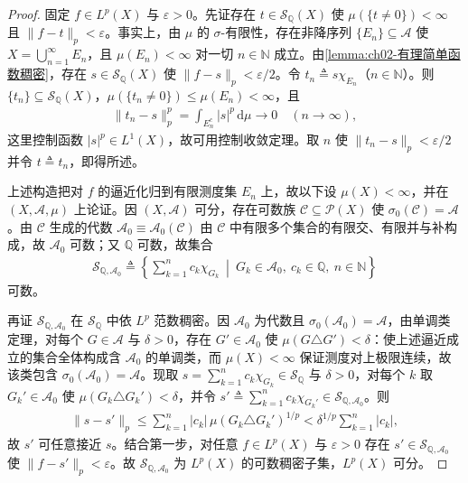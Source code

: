 \documentclass[../../main.tex]{subfiles}%
\begin{document}
\begin{proof}
固定 $f\in L^p(X)$ 与 $\varepsilon>0$。先证存在 $t\in\mathscr S_{\mathbb Q}(X)$ 使 $\mu(\{t\neq0\})<\infty$ 且 $\|f-t\|_p<\varepsilon$。事实上，由 $\mu$ 的 $\sigma$-有限性，存在非降序列 $\{E_n\}\subseteq\mathscr A$ 使 $X=\bigcup_{n=1}^\infty E_n$，且 $\mu(E_n)<\infty$ 对一切 $n\in\mathbb N$ 成立。由\cref{lemma:ch02-有理简单函数稠密}，存在 $s\in\mathscr S_{\mathbb Q}(X)$ 使 $\|f-s\|_p<\varepsilon/2$。令 $t_n\triangleq s\chi_{E_n}$（$n\in\mathbb N$）。则 $\{t_n\}\subseteq\mathscr S_{\mathbb Q}(X)$，$\mu(\{t_n\neq0\})\leqslant\mu(E_n)<\infty$，且
\begin{align*}
\|t_n-s\|_p^p=\int_{E_n^c}|s|^p\,\mathrm{d}\mu\to0\quad(n\to\infty),
\end{align*}
这里控制函数 $|s|^p\in L^1(X)$，故可用控制收敛定理。取 $n$ 使 $\|t_n-s\|_p<\varepsilon/2$ 并令 $t\triangleq t_n$，即得所述。

上述构造把对 $f$ 的逼近化归到有限测度集 $E_n$ 上，故以下设 $\mu(X)<\infty$，并在 $(X,\mathscr A,\mu)$ 上论证。因 $(X,\mathscr A)$ 可分，存在可数族 $\mathscr C\subseteq\mathscr P(X)$ 使 $\sigma_0(\mathscr C)=\mathscr A$。由 $\mathscr C$ 生成的代数 $\mathscr A_0\equiv\mathscr A_0(\mathscr C)$ 由 $\mathscr C$ 中有限多个集合的有限交、有限并与补构成，故 $\mathscr A_0$ 可数；又 $\mathbb Q$ 可数，故集合
\begin{align*}
\mathscr S_{\mathbb Q,\mathscr A_0}\triangleq \left\{\sum_{k=1}^n c_k\chi_{G_k}\ \middle|\ G_k\in\mathscr A_0,\ c_k\in\mathbb Q,\ n\in\mathbb N\right\}
\end{align*}
可数。

再证 $\mathscr S_{\mathbb Q,\mathscr A_0}$ 在 $\mathscr S_{\mathbb Q}$ 中依 $L^p$ 范数稠密。因 $\mathscr A_0$ 为代数且 $\sigma_0(\mathscr A_0)=\mathscr A$，由单调类定理，对每个 $G\in\mathscr A$ 与 $\delta>0$，存在 $G'\in\mathscr A_0$ 使 $\mu(G\triangle G')<\delta$：使上述逼近成立的集合全体构成含 $\mathscr A_0$ 的单调类，而 $\mu(X)<\infty$ 保证测度对上极限连续，故该类包含 $\sigma_0(\mathscr A_0)=\mathscr A$。现取 $s=\sum_{k=1}^n c_k\chi_{G_k}\in\mathscr S_{\mathbb Q}$ 与 $\delta>0$，对每个 $k$ 取 $G_k'\in\mathscr A_0$ 使 $\mu(G_k\triangle G_k')<\delta$，并令 $s'\triangleq\sum_{k=1}^n c_k\chi_{G_k'}\in\mathscr S_{\mathbb Q,\mathscr A_0}$。则
\begin{align*}
\|s-s'\|_p\leqslant\sum_{k=1}^n|c_k|\,\mu(G_k\triangle G_k')^{1/p}<\delta^{1/p}\sum_{k=1}^n|c_k|,
\end{align*}
故 $s'$ 可任意接近 $s$。结合第一步，对任意 $f\in L^p(X)$ 与 $\varepsilon>0$ 存在 $s'\in\mathscr S_{\mathbb Q,\mathscr A_0}$ 使 $\|f-s'\|_p<\varepsilon$。故 $\mathscr S_{\mathbb Q,\mathscr A_0}$ 为 $L^p(X)$ 的可数稠密子集，$L^p(X)$ 可分。
\end{proof}
\end{document}
